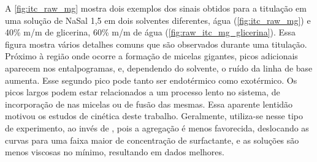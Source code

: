 		
		A \autoref{fig:itc_raw_mg} mostra dois exemplos dos sinais obtidos para a titulação \TTAB{} em uma solução de NaSal 1,5 \mM{} em dois solventes diferentes, água (\autoref{fig:itc_raw_mg}) e 40\% m/m de glicerina, 60\% m/m de água (\autoref{fig:raw_itc_mg_glicerina}). Essa figura mostra vários detalhes comuns que são observados durante uma titulação. Próximo à região onde ocorre a formação de micelas gigantes, picos adicionais aparecem nos entalpogramas, e, dependendo do solvente, o ruído da linha de base aumenta. Esse segundo pico pode tanto ser endotérmico como exotérmico. Os picos largos podem estar relacionados a um processo lento no sistema, de incorporação de \Sal{} nas micelas ou de fusão das mesmas.\cite{Ito2016} Essa aparente lentidão motivou os estudos de cinética deste trabalho. %
		Geralmente, utiliza-se \TTAB{} nesse tipo de experimento, ao invés de \CTAB{}, pois a agregação é menos favorecida, deslocando as curvas para uma faixa maior de concentração de surfactante, e as soluções são menos viscosas no mínimo, resultando em dados melhores.
		
